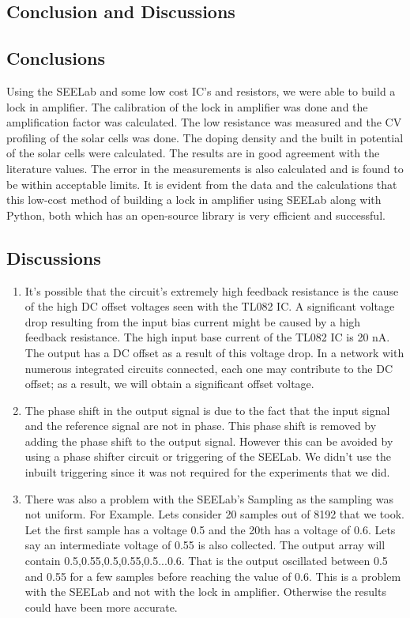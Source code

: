 \documentclass{article}
\begin{document}
\begin{multicols}{2}
\section{Conclusion and Discussions}

\subsection{Conclusions}

Using the SEELab and some low cost IC's and resistors, we were able to build a lock in amplifier. The calibration of the lock in amplifier was done and the amplification factor was calculated. The low resistance was measured and the CV profiling of the solar cells was done. The doping density and the built in potential of the solar cells were calculated. The results are in good agreement with the literature values. The error in the measurements is also calculated and is found to be within acceptable limits.
It is evident from the data and the calculations that this low-cost method of building a lock in amplifier using SEELab along with Python, both which has an open-source library is very efficient and successful. 


\subsection{Discussions}


\begin{enumerate}
    \item It's possible that the circuit's extremely high feedback resistance is the cause of the high DC offset voltages seen with the TL082 IC. A significant voltage drop resulting from the input bias current might be caused by a high feedback resistance. The high input base current of the TL082 IC is 20 nA. The output has a DC offset as a result of this voltage drop. In a network with numerous integrated circuits connected, each one may contribute to the DC offset; as a result, we will obtain a significant offset voltage.
    \item The phase shift in the output signal is due to the fact that the input signal and the reference signal are not in phase. This phase shift is removed by adding the phase shift to the output signal. However this can be avoided by using a phase shifter circuit or triggering of the SEELab. We didn't use the inbuilt triggering since it was not required for the experiments that we did. 
    \item There was also a problem with the SEELab's Sampling as the sampling was not uniform. For Example. Lets consider 20 samples out of 8192 that we took. Let the first sample has a voltage 0.5 and the 20th has a voltage of 0.6. Lets say an intermediate voltage of 0.55 is also collected. The output array will contain 0.5,0.55,0.5,0.55,0.5...0.6. That is the output oscillated between 0.5 and 0.55 for a few samples before reaching the value of 0.6. This is a problem with the SEELab and not with the lock in amplifier. Otherwise the results could have been more accurate.
\end{enumerate}


\end{multicols}
\end{document}
